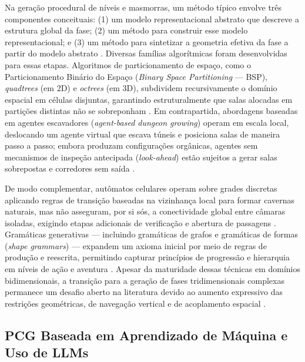 Na geração procedural de níveis e masmorras, um método típico envolve três componentes conceituais: (1) um modelo representacional abstrato que descreve a estrutura global da fase; (2) um método para construir esse modelo representacional; e (3) um método para sintetizar a geometria efetiva da fase a partir do modelo abstrato \cite{linden2014dungeons, shaker2016constructive}. Diversas famílias algorítmicas foram desenvolvidas para essas etapas. Algoritmos de particionamento de espaço, como o Particionamento Binário do Espaço (\textit{Binary Space Partitioning} --- BSP), \textit{quadtrees} (em 2D) e \textit{octrees} (em 3D), subdividem recursivamente o domínio espacial em células disjuntas, garantindo estruturalmente que salas alocadas em partições distintas não se sobreponham \cite{shaker2016constructive}. Em contrapartida, abordagens baseadas em agentes escavadores (\textit{agent-based dungeon growing}) operam em escala local, deslocando um agente virtual que escava túneis e posiciona salas de maneira passo a passo; embora produzam configurações orgânicas, agentes sem mecanismos de inspeção antecipada (\textit{look-ahead}) estão sujeitos a gerar salas sobrepostas e corredores sem saída \cite{shaker2016constructive}.

De modo complementar, autômatos celulares operam sobre grades discretas aplicando regras de transição baseadas na vizinhança local para formar cavernas naturais, mas não asseguram, por si sós, a conectividade global entre câmaras isoladas, exigindo etapas adicionais de verificação e abertura de passagens \cite{linden2014dungeons, shaker2016constructive}. Gramáticas generativas --- incluindo gramáticas de grafos e gramáticas de formas (\textit{shape grammars}) --- expandem um axioma inicial por meio de regras de produção e reescrita, permitindo capturar princípios de progressão e hierarquia em níveis de ação e aventura \cite{dormans2010, linden2013designing, shaker2016constructive}. Apesar da maturidade dessas técnicas em domínios bidimensionais, a transição para a geração de fases tridimensionais complexas permanece um desafio aberto na literatura devido ao aumento expressivo das restrições geométricas, de navegação vertical e de acoplamento espacial \cite{linden2014dungeons, maleki2024procedural, xu2025constraint}.

\subsection{PCG Baseada em Aprendizado de Máquina e Uso de LLMs}
\label{sec:pcgml_llms}

